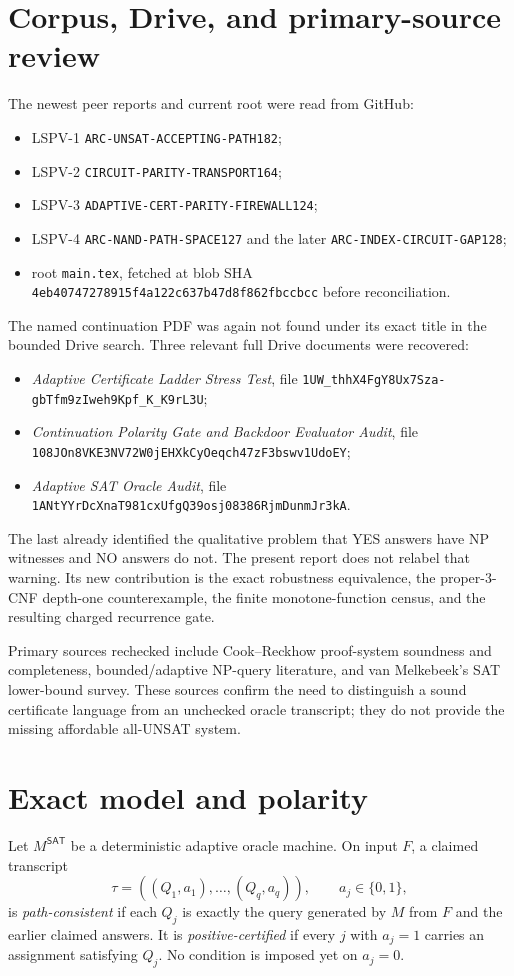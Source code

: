 \documentclass[11pt]{article}
\newcommand{\SAT}{\mathsf{SAT}}
\begin{document}
\section*{Corpus, Drive, and primary-source review}
The newest peer reports and current root were read from GitHub:
\begin{itemize}
  \item LSPV-1 \texttt{ARC-UNSAT-ACCEPTING-PATH182};
  \item LSPV-2 \texttt{CIRCUIT-PARITY-TRANSPORT164};
  \item LSPV-3 \texttt{ADAPTIVE-CERT-PARITY-FIREWALL124};
  \item LSPV-4 \texttt{ARC-NAND-PATH-SPACE127} and the later
        \texttt{ARC-INDEX-CIRCUIT-GAP128};
  \item root \texttt{main.tex}, fetched at blob SHA
        \texttt{4eb40747278915f4a122c637b47d8f862fbccbcc} before reconciliation.
\end{itemize}
The named continuation PDF was again not found under its exact title in the
bounded Drive search.  Three relevant full Drive documents were recovered:
\begin{itemize}
  \item \emph{Adaptive Certificate Ladder Stress Test}, file
        \texttt{1UW\_thhX4FgY8Ux7Sza-gbTfm9zIweh9Kpf\_K\_K9rL3U};
  \item \emph{Continuation Polarity Gate and Backdoor Evaluator Audit}, file
        \texttt{108JOn8VKE3NV72W0jEHXkCyOeqch47zF3bswv1UdoEY};
  \item \emph{Adaptive SAT Oracle Audit}, file
        \texttt{1ANtYYrDcXnaT981cxUfgQ39osj08386RjmDunmJr3kA}.
\end{itemize}
The last already identified the qualitative problem that YES answers have NP
witnesses and NO answers do not.  The present report does not relabel that
warning.  Its new contribution is the exact robustness equivalence, the
proper-3-CNF depth-one counterexample, the finite monotone-function census, and
the resulting charged recurrence gate.

Primary sources rechecked include Cook--Reckhow proof-system soundness and
completeness, bounded/adaptive NP-query literature, and van Melkebeek's SAT
lower-bound survey.  These sources confirm the need to distinguish a sound
certificate language from an unchecked oracle transcript; they do not provide
the missing affordable all-UNSAT system.

\section*{Exact model and polarity}
Let $M^{\SAT}$ be a deterministic adaptive oracle machine.  On input $F$, a
claimed transcript
\[
 \tau=((Q_1,a_1),\ldots,(Q_q,a_q)),\qquad a_j\in\{0,1\},
\]
is \emph{path-consistent} if each $Q_j$ is exactly the query generated by $M$
from $F$ and the earlier claimed answers.  It is
\emph{positive-certified} if every $j$ with $a_j=1$ carries an assignment
satisfying $Q_j$.  No condition is imposed yet on $a_j=0$.
\end{document}
